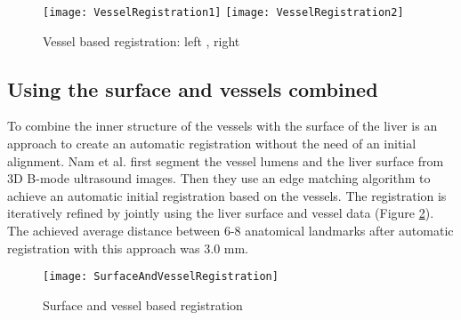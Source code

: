 
\begin{figure}[H]
  \centering
 \texttt{[image: VesselRegistration1]}
  \endminipage
  \hfill
 \texttt{[image: VesselRegistration2]}
  \endminipage
  \hfill
 \caption{Vessel based registration: left \cite{ribes2012image}, right \cite{lange20093d}}
  \label{fig:VesselRegistration}
\end{figure}


\subsection{Using the surface and vessels combined}
To combine the inner structure of the vessels with the surface of the liver is
an approach to create an automatic registration without the need of an initial
alignment. Nam et al. \cite{nam2011automatic} first segment the vessel lumens and the liver surface from 3D
B-mode ultrasound images. Then they use an edge matching algorithm to achieve an
automatic initial registration based on the vessels. The registration is
iteratively refined by jointly using the liver surface and vessel data (Figure
\ref{fig:SurfaceAndVesselRegistration}). The achieved average distance between
6-8 anatomical landmarks after automatic registration with this approach was 3.0 mm.

\begin{figure}[H]
  \centering
 \texttt{[image: SurfaceAndVesselRegistration]}
 \caption{Surface and vessel based registration \cite{nam2011automatic}}
  \label{fig:SurfaceAndVesselRegistration}
\end{figure}




